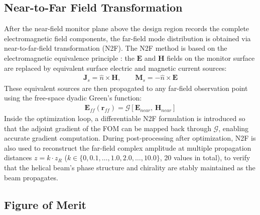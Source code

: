 \subsection{Near-to-Far Field Transformation}

After the near-field monitor plane above the design region records the complete electromagnetic field components, the far-field mode distribution is obtained via near-to-far-field transformation (N2F). The N2F method is based on the electromagnetic equivalence principle \cite{taflove2005computational, balanis2016antenna}: the $\mathbf{E}$ and $\mathbf{H}$ fields on the monitor surface are replaced by equivalent surface electric and magnetic current sources:
\begin{align}
\mathbf{J}_s = \hat{n}\times\mathbf{H}, \qquad \mathbf{M}_s = -\hat{n}\times\mathbf{E}
\end{align}
These equivalent sources are then propagated to any far-field observation point using the free-space dyadic Green's function:
\begin{align}
\mathbf{E}_{ff} (\mathbf{r}_{ff}) = \mathcal{G}\!\left[\mathbf{E}_{near},\, \mathbf{H}_{near}\right]
\end{align}
Inside the optimization loop, a differentiable N2F formulation is introduced so that the adjoint gradient of the FOM can be mapped back through $\mathcal{G}$, enabling accurate gradient computation. During post-processing after optimization, N2F is also used to reconstruct the far-field complex amplitude at multiple propagation distances $z = k\cdot z_R$ ($k \in \{0, 0.1, \dots, 1.0, 2.0, \dots, 10.0\}$, 20 values in total), to verify that the helical beam's phase structure and chirality are stably maintained as the beam propagates.

\subsection{Figure of Merit}

\label{ssec:FOM}

